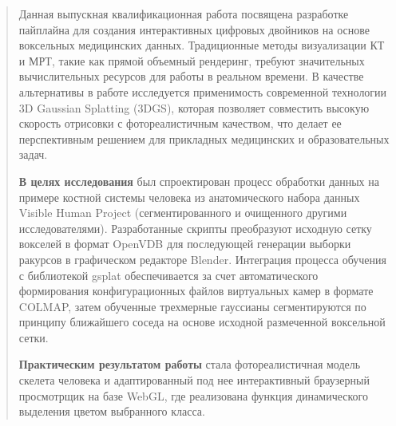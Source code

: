\begin{abstract}
	Данная выпускная квалификационная работа посвящена разработке пайплайна для создания интерактивных цифровых двойников на основе воксельных медицинских данных. Традиционные методы визуализации КТ и МРТ, такие как прямой объемный рендеринг, требуют значительных вычислительных ресурсов для работы в реальном времени. В качестве альтернативы в работе исследуется применимость современной технологии 3D Gaussian Splatting (3DGS), которая позволяет совместить высокую скорость отрисовки с фотореалистичным качеством, что делает ее перспективным решением для прикладных медицинских и образовательных задач.
	
	\textbf{В целях исследования} был спроектирован процесс обработки данных на примере костной системы человека из анатомического набора данных Visible Human Project (сегментированного и очищенного другими исследователями). Разработанные скрипты преобразуют исходную сетку вокселей в формат OpenVDB для последующей генерации выборки ракурсов в графическом редакторе Blender. Интеграция процесса обучения с библиотекой gsplat обеспечивается за счет автоматического формирования конфигурационных файлов виртуальных камер в формате COLMAP, затем обученные трехмерные гауссианы сегментируются по принципу ближайшего соседа на основе исходной размеченной воксельной сетки.
	
	\textbf{Практическим результатом работы} стала фотореалистичная модель скелета человека и адаптированный под нее интерактивный браузерный просмотрщик на базе WebGL, где реализована функция динамического выделения цветом выбранного класса.
\end{abstract}